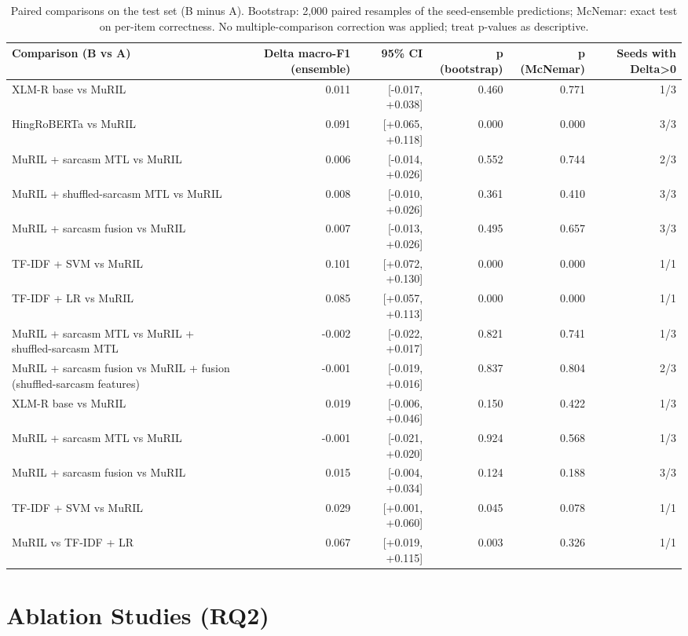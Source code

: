 \documentclass[10pt,twocolumn]{article}
\begin{document}
\begin{table}[t]
\centering
\small
\caption{Paired comparisons on the test set (B minus A). Bootstrap: 2,000 paired resamples of the seed-ensemble predictions; McNemar: exact test on per-item correctness. No multiple-comparison correction was applied; treat p-values as descriptive.}
\label{tab:paired}
\begin{adjustbox}{max width=\textwidth}\begin{tabular}{lrrrrr}
\toprule
Comparison (B vs A) & Delta macro-F1 (ensemble) & 95\% CI & p (bootstrap) & p (McNemar) & Seeds with Delta>0 \\
\midrule
XLM-R base vs MuRIL & 0.011 & [-0.017, +0.038] & 0.460 & 0.771 & 1/3 \\
HingRoBERTa vs MuRIL & 0.091 & [+0.065, +0.118] & 0.000 & 0.000 & 3/3 \\
MuRIL + sarcasm MTL vs MuRIL & 0.006 & [-0.014, +0.026] & 0.552 & 0.744 & 2/3 \\
MuRIL + shuffled-sarcasm MTL vs MuRIL & 0.008 & [-0.010, +0.026] & 0.361 & 0.410 & 3/3 \\
MuRIL + sarcasm fusion vs MuRIL & 0.007 & [-0.013, +0.026] & 0.495 & 0.657 & 3/3 \\
TF-IDF + SVM vs MuRIL & 0.101 & [+0.072, +0.130] & 0.000 & 0.000 & 1/1 \\
TF-IDF + LR vs MuRIL & 0.085 & [+0.057, +0.113] & 0.000 & 0.000 & 1/1 \\
MuRIL + sarcasm MTL vs MuRIL + shuffled-sarcasm MTL & -0.002 & [-0.022, +0.017] & 0.821 & 0.741 & 1/3 \\
MuRIL + sarcasm fusion vs MuRIL + fusion (shuffled-sarcasm features) & -0.001 & [-0.019, +0.016] & 0.837 & 0.804 & 2/3 \\
XLM-R base vs MuRIL & 0.019 & [-0.006, +0.046] & 0.150 & 0.422 & 1/3 \\
MuRIL + sarcasm MTL vs MuRIL & -0.001 & [-0.021, +0.020] & 0.924 & 0.568 & 1/3 \\
MuRIL + sarcasm fusion vs MuRIL & 0.015 & [-0.004, +0.034] & 0.124 & 0.188 & 3/3 \\
TF-IDF + SVM vs MuRIL & 0.029 & [+0.001, +0.060] & 0.045 & 0.078 & 1/1 \\
MuRIL vs TF-IDF + LR & 0.067 & [+0.019, +0.115] & 0.003 & 0.326 & 1/1 \\
\bottomrule
\end{tabular}\end{adjustbox}
\end{table}


\section{Ablation Studies (RQ2)}
\end{document}
